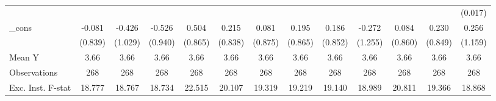{\begin{tabular}{l*{12}{c}}
            &                     &                     &                     &                     &                     &                     &                     &                     &                     &                     &                     &     (0.017)         \\
\addlinespace
\_cons      &      -0.081         &      -0.426         &      -0.526         &       0.504         &       0.215         &       0.081         &       0.195         &       0.186         &      -0.272         &       0.084         &       0.230         &       0.256         \\
            &     (0.839)         &     (1.029)         &     (0.940)         &     (0.865)         &     (0.838)         &     (0.875)         &     (0.865)         &     (0.852)         &     (1.255)         &     (0.860)         &     (0.849)         &     (1.159)         \\
\midrule
Mean Y      &        3.66         &        3.66         &        3.66         &        3.66         &        3.66         &        3.66         &        3.66         &        3.66         &        3.66         &        3.66         &        3.66         &        3.66         \\
Observations&         268         &         268         &         268         &         268         &         268         &         268         &         268         &         268         &         268         &         268         &         268         &         268         \\
Exc. Inst. F-stat&      18.777         &      18.767         &      18.734         &      22.515         &      20.107         &      19.319         &      19.219         &      19.140         &      18.989         &      20.811         &      19.366         &      18.868         \\
\bottomrule
\end{tabular}
}
